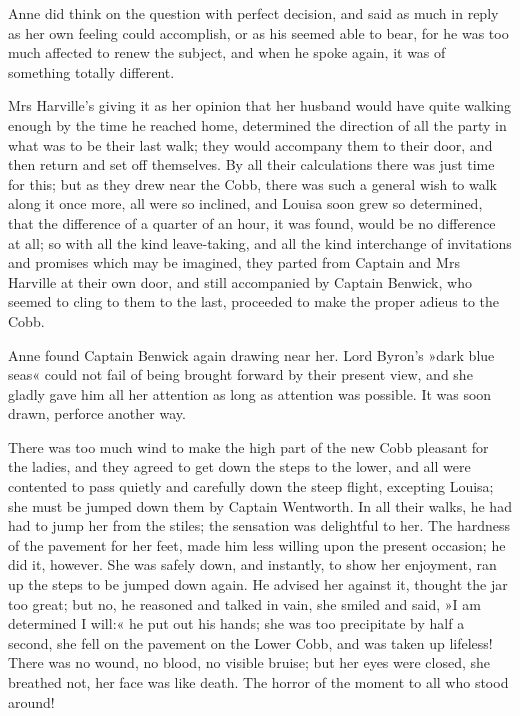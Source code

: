 Anne did think on the question with perfect decision, and said as much in reply as her own feeling could accomplish, or as his seemed able to bear, for he was too much affected to renew the subject, and when he spoke again, it was of something totally different.

Mrs Harville's giving it as her opinion that her husband would have quite walking enough by the time he reached home, determined the direction of all the party in what was to be their last walk; they would accompany them to their door, and then return and set off themselves. By all their calculations there was just time for this; but as they drew near the Cobb, there was such a general wish to walk along it once more, all were so inclined, and Louisa soon grew so determined, that the difference of a quarter of an hour, it was found, would be no difference at all; so with all the kind leave-taking, and all the kind interchange of invitations and promises which may be imagined, they parted from Captain and Mrs Harville at their own door, and still accompanied by Captain Benwick, who seemed to cling to them to the last, proceeded to make the proper adieus to the Cobb.

Anne found Captain Benwick again drawing near her. Lord Byron's »dark blue seas« could not fail of being brought forward by their present view, and she gladly gave him all her attention as long as attention was possible. It was soon drawn, perforce another way.

There was too much wind to make the high part of the new Cobb pleasant for the ladies, and they agreed to get down the steps to the lower, and all were contented to pass quietly and carefully down the steep flight, excepting Louisa; she must be jumped down them by Captain Wentworth. In all their walks, he had had to jump her from the stiles; the sensation was delightful to her. The hardness of the pavement for her feet, made him less willing upon the present occasion; he did it, however. She was safely down, and instantly, to show her enjoyment, ran up the steps to be jumped down again. He advised her against it, thought the jar too great; but no, he reasoned and talked in vain, she smiled and said, »I am determined I will:« he put out his hands; she was too precipitate by half a second, she fell on the pavement on the Lower Cobb, and was taken up lifeless! There was no wound, no blood, no visible bruise; but her eyes were closed, she breathed not, her face was like death. The horror of the moment to all who stood around!


